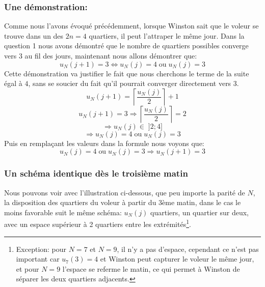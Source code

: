 \subsubsection{Une démonstration:}
Comme nous l'avons évoqué précédemment, lorsque Winston sait que le voleur se trouve dans un des $2n=4$ quartiers, il peut l'attraper le même jour. Dans la question 1 nous avons démontré que le nombre de quartiers possibles converge vers $3$ au fil des jours, maintenant nous allons démontrer que: $$u_N(j+1)=3\iff u_N(j)=4\; \text{ou}\; u_N(j)=3$$
Cette démonstration va justifier le fait que nous cherchons le terme de la suite égal à $4$, sans se soucier du fait qu'il pourrait converger directement vers $3$.
$$u_N(j+1)=\left\lceil{\dfrac{u_N(j)}{2}}\right\rceil+1$$
$$u_N(j+1)=3\Rightarrow \left\lceil{\dfrac{u_N(j)}{2}}\right\rceil=2$$
$$\Rightarrow u_N(j)\in \; ]2;4]$$
$$\Rightarrow u_N(j)=4\; \text{ou}\; u_N(j)=3$$
Puis en remplaçant les valeurs dans la formule nous voyons que:
$$u_N(j)=4\; \text{ou}\; u_N(j)=3\Rightarrow u_N(j+1)=3$$

\subsubsection{Un schéma identique dès le troisième matin}
Nous pouvons voir avec l'illustration ci-dessous, que peu importe la parité de $N$, la disposition des quartiers du voleur à partir du 3ème matin, dans le cas le moins favorable suit le même schéma: $u_N(j)$ quartiers, un quartier sur deux, avec un espace supérieur à 2 quartiers entre les extrémités\footnote{Exception: pour $N=7$ et $N=9$, il n'y a pas d'espace, cependant ce n'est pas important car $u_7(3)=4$ et Winston peut capturer le voleur le même jour, et pour $N=9$ l'espace se referme le matin, ce qui permet à Winston de séparer les deux quartiers adjacents.}.

